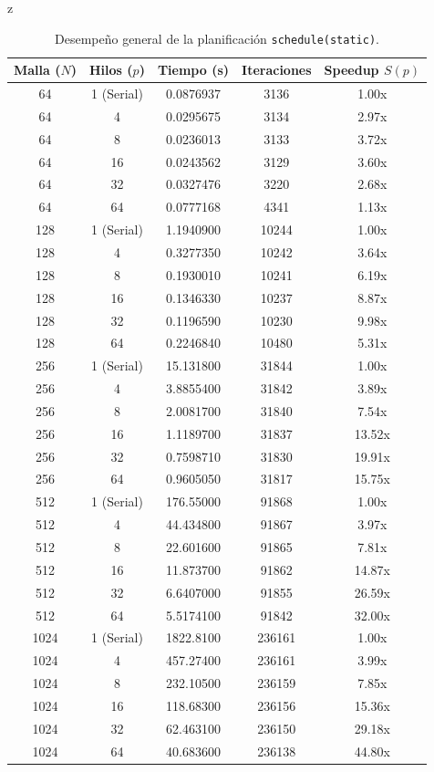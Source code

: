 z\documentclass[11pt,a4paper]{article}
\begin{document}
\begin{table}[H]
\centering
\renewcommand{\arraystretch}{1.2}
\small
\begin{tabular}{|c|c|c|c|c|}
\hline
\textbf{Malla ($N$)} & \textbf{Hilos ($p$)} & \textbf{Tiempo (s)} & \textbf{Iteraciones} & \textbf{Speedup $S(p)$} \\ \hline
64 & 1 (Serial) & 0.0876937 & 3136 & 1.00x \\ 
64 & 4 & 0.0295675 & 3134 & 2.97x \\ 
64 & 8 & 0.0236013 & 3133 & 3.72x \\ 
64 & 16 & 0.0243562 & 3129 & 3.60x \\ 
64 & 32 & 0.0327476 & 3220 & 2.68x \\ 
64 & 64 & 0.0777168 & 4341 & 1.13x \\ \hline
128 & 1 (Serial) & 1.1940900 & 10244 & 1.00x \\ 
128 & 4 & 0.3277350 & 10242 & 3.64x \\ 
128 & 8 & 0.1930010 & 10241 & 6.19x \\ 
128 & 16 & 0.1346330 & 10237 & 8.87x \\ 
128 & 32 & 0.1196590 & 10230 & 9.98x \\ 
128 & 64 & 0.2246840 & 10480 & 5.31x \\ \hline
256 & 1 (Serial) & 15.131800 & 31844 & 1.00x \\ 
256 & 4 & 3.8855400 & 31842 & 3.89x \\ 
256 & 8 & 2.0081700 & 31840 & 7.54x \\ 
256 & 16 & 1.1189700 & 31837 & 13.52x \\ 
256 & 32 & 0.7598710 & 31830 & 19.91x \\ 
256 & 64 & 0.9605050 & 31817 & 15.75x \\ \hline
512 & 1 (Serial) & 176.55000 & 91868 & 1.00x \\ 
512 & 4 & 44.434800 & 91867 & 3.97x \\ 
512 & 8 & 22.601600 & 91865 & 7.81x \\ 
512 & 16 & 11.873700 & 91862 & 14.87x \\ 
512 & 32 & 6.6407000 & 91855 & 26.59x \\ 
512 & 64 & 5.5174100 & 91842 & 32.00x \\ \hline
1024 & 1 (Serial) & 1822.8100 & 236161 & 1.00x \\ 
1024 & 4 & 457.27400 & 236161 & 3.99x \\ 
1024 & 8 & 232.10500 & 236159 & 7.85x \\ 
1024 & 16 & 118.68300 & 236156 & 15.36x \\ 
1024 & 32 & 62.463100 & 236150 & 29.18x \\ 
1024 & 64 & 40.683600 & 236138 & 44.80x \\ \hline
\end{tabular}
\caption{Desempeño general de la planificación \texttt{schedule(static)}.}
\label{tab:resultados_schedule}
\end{table}
\end{document}
